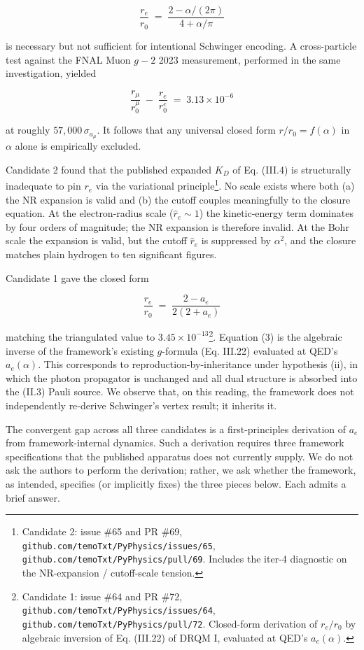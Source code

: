 \documentclass[
  11pt,
]{article}
\begin{document}
\[
\frac{r_e}{r_0} \;=\; \frac{2 - \alpha/(2\pi)}{4 + \alpha/\pi}
\tag{1}
\]

is necessary but not sufficient for intentional Schwinger encoding. A
cross-particle test against the FNAL Muon \(g-2\) 2023 measurement,
performed in the same investigation, yielded

\[
\frac{r_\mu}{r_0^\mu} \;-\; \frac{r_e}{r_0^e} \;=\; 3.13 \times 10^{-6}
\tag{2}
\]

at roughly \(57{,}000\,\sigma_{a_\mu}\). It follows that any universal
closed form \(r/r_0 = f(\alpha)\) in \(\alpha\) alone is empirically
excluded.

Candidate 2 found that the published expanded \(K_D\) of Eq. (III.4) is
structurally inadequate to pin \(r_e\) via the variational
principle\footnote{Candidate 2: issue \#65 and PR \#69,
  \texttt{github.com/temoTxt/PyPhysics/issues/65},
  \texttt{github.com/temoTxt/PyPhysics/pull/69}. Includes the iter-4
  diagnostic on the NR-expansion / cutoff-scale tension.}. No scale
exists where both (a) the NR expansion is valid and (b) the cutoff
couples meaningfully to the closure equation. At the electron-radius
scale (\(\hat r_e \sim 1\)) the kinetic-energy term dominates by four
orders of magnitude; the NR expansion is therefore invalid. At the Bohr
scale the expansion is valid, but the cutoff \(\hat r_e\) is suppressed
by \(\alpha^2\), and the closure matches plain hydrogen to ten
significant figures.

Candidate 1 gave the closed form

\[
\frac{r_e}{r_0} \;=\; \frac{2 - a_e}{2(2 + a_e)}
\tag{3}
\]

matching the triangulated value to \(3.45 \times 10^{-13}\)\footnote{Candidate
  1: issue \#64 and PR \#72,
  \texttt{github.com/temoTxt/PyPhysics/issues/64},
  \texttt{github.com/temoTxt/PyPhysics/pull/72}. Closed-form derivation
  of \(r_e/r_0\) by algebraic inversion of Eq. (III.22) of DRQM I,
  evaluated at QED's \(a_e(\alpha)\).}. Equation (3) is the algebraic
inverse of the framework's existing \(g\)-formula (Eq. III.22) evaluated
at QED's \(a_e(\alpha)\). This corresponds to
reproduction-by-inheritance under hypothesis (ii), in which the photon
propagator is unchanged and all dual structure is absorbed into the
(II.3) Pauli source. We observe that, on this reading, the framework
does not independently re-derive Schwinger's vertex result; it inherits
it.

The convergent gap across all three candidates is a first-principles
derivation of \(a_e\) from framework-internal dynamics. Such a
derivation requires three framework specifications that the published
apparatus does not currently supply. We do not ask the authors to
perform the derivation; rather, we ask whether the framework, as
intended, specifies (or implicitly fixes) the three pieces below. Each
admits a brief answer.
\end{document}
